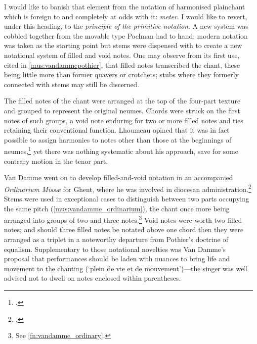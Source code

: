   {\cite[30--31]{VanDammeUtilitepratiqueGraduel1883}}
{I would like to banish that element from the notation of harmonised plainchant which is foreign to and completely at odds with it: \emph{meter}. I would like to revert, under this heading, to the \emph{principle of the primitive notation}.}
\noindent
A new system was cobbled together from the movable type Poelman had to hand: modern notation was taken as the starting point but stems were dispensed with to create a new notational system of filled and void notes.
One may observe from its first use, cited in \cref{mus:vandammepothier}, that filled notes transcribed the chant, these being little more than former quavers or crotchets; stubs where they formerly connected with stems may still be discerned.

The filled notes of the chant were arranged at the top of the four-part texture and grouped to represent the original neumes.
Chords were struck on the first notes of such groups, a void note enduring for two or more filled notes and ties retaining their conventional function.
Lhoumeau opined that it was in fact possible to assign harmonies to notes other than those at the beginnings of neumes,\footcite[15]{Lhoumeauharmonisationmelodiesgregoriennes1884} yet there was nothing systematic about his approach, save for some contrary motion in the tenor part.

Van Damme went on to develop filled-and-void notation in an accompanied \emph{Ordinarium Missæ} for Ghent, where he was involved in diocesan administration.\footcite[39]{CollinPierreJeanVan1979}
Stems were used in exceptional cases to distinguish between two parts occupying the same pitch (\cref{mus:vandamme_ordinarium}), the chant once more being arranged into groups of two and three notes.\footnote{See \cref{fn:vandamme_ordinary}.}
Void notes were worth two filled notes; and should three filled notes be notated above one chord then they were arranged as a triplet in a noteworthy departure from Pothier's doctrine of equalism.
Supplementary to those notational novelties was Van Damme's proposal that performances should be laden with nuances to bring life and movement to the chanting (`plein de vie et de mouvement')---the singer was well advised not to dwell on notes enclosed within parentheses.

